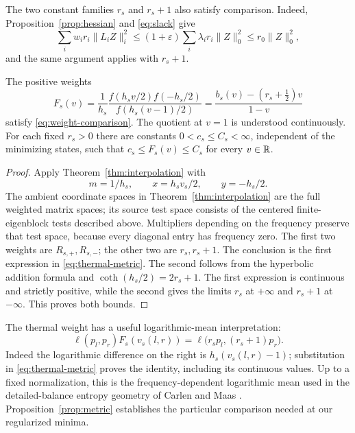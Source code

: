The two constant families $r_s$ and $r_s+1$ also satisfy comparison.
Indeed, Proposition~\ref{prop:hessian} and \eqref{eq:slack} give
\[
 \sum_i w_i r_i\|L_iZ\|_i^2
 \le (1+\varepsilon)\sum_i\lambda_i r_i\|Z\|_0^2
 \le r_0\|Z\|_0^2,
\]
and the same argument applies with $r_s+1$.

\begin{proposition}\label{prop:metric}
The positive weights
\begin{equation}\label{eq:thermal-metric}
 F_s(v)=\frac1{h_s}
 \frac{f(h_sv/2)f(-h_s/2)}{f(h_s(v-1)/2)}
 =\frac{b_s(v)-(r_s+\tfrac12)v}{1-v}
\end{equation}
satisfy \eqref{eq:weight-comparison}.  The quotient at $v=1$ is understood
continuously.  For each fixed $r_s>0$ there are constants
$0<c_s\le C_s<\infty$, independent of the minimizing states, such that
$c_s\le F_s(v)\le C_s$ for every $v\in\mathbb R$.
\end{proposition}

\begin{proof}
Apply Theorem~\ref{thm:interpolation} with
\[
 m=1/h_s,\qquad x=h_sv_s/2,\qquad y=-h_s/2.
\]
The ambient coordinate spaces in Theorem~\ref{thm:interpolation} are the full weighted matrix spaces; its source test space consists of the centered finite-eigenblock tests described above. Multipliers depending on the frequency preserve that test space, because every diagonal entry has frequency zero. The first two weights are $R_{s,+},R_{s,-}$; the other two are
$r_s,r_s+1$.  The conclusion is the first expression in
\eqref{eq:thermal-metric}.  The second follows from the hyperbolic addition
formula and $\coth(h_s/2)=2r_s+1$.
The first expression is continuous and strictly positive, while the second
gives the limits $r_s$ at $+\infty$ and $r_s+1$ at $-\infty$.
This proves both bounds.
\end{proof}

The thermal weight has a useful logarithmic-mean interpretation:
\begin{equation}\label{eq:tilted-logmean}
 \ell(p_l,p_r)F_s(v_s(l,r))
 =\ell\bigl(r_sp_l,(r_s+1)p_r\bigr).
\end{equation}
Indeed the logarithmic difference on the right is
$h_s(v_s(l,r)-1)$; substitution in \eqref{eq:thermal-metric} proves the
identity, including its continuous values. Up to a fixed normalization,
this is the frequency-dependent logarithmic mean used in the
detailed-balance entropy geometry of Carlen and Maas
\cite[Definition~5.7 and Lemma~5.8]{CarlenMaas2017}.
Proposition~\ref{prop:metric} establishes the particular comparison
needed at our regularized minima.

